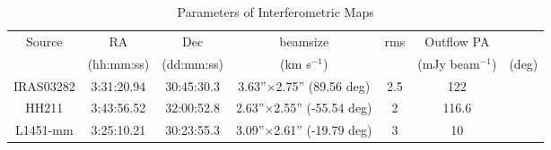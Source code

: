 \begin{table} 
\label{table:obs}
\caption{Parameters of Interferometric Maps}
    \begin{tabular}{ c c c c c c}
        Source & RA & Dec & beamsize & rms & Outflow PA\\ 
         & (hh:mm:ss) & (dd:mm:ss) & (km s$^{-1}$) &  & (mJy beam$^{-1}$) & (deg) \\ 
        IRAS03282 & 3:31:20.94 & 30:45:30.3 & 3.63''$\times$2.75'' (89.56  deg) & 2.5 & 122\\ 
        HH211     & 3:43:56.52 & 32:00:52.8 & 2.63''$\times$2.55'' (-55.54 deg) & 2 & 116.6\\ 
        L1451-mm  & 3:25:10.21 & 30:23:55.3 & 3.09''$\times$2.61'' (-19.79 deg) & 3 & 10\\ 
    \end{tabular} 
\end{table}
